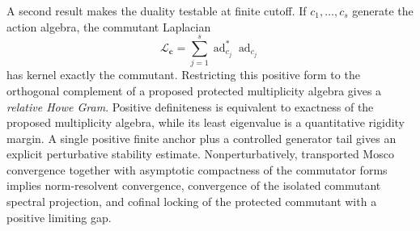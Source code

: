 \documentclass[11pt]{article}
\theoremstyle{definition}
\theoremstyle{remark}
\begin{document}
A second result makes the duality testable at finite cutoff.  If
$c_1,\ldots,c_s$ generate the action algebra, the commutant Laplacian
\[
\mathscr L_{\bm c}
=
\sum_{j=1}^{s}\operatorname{ad}_{c_j}^*
                 \operatorname{ad}_{c_j}
\]
has kernel exactly the commutant.  Restricting this positive form to the
orthogonal complement of a proposed protected multiplicity algebra gives a
\emph{relative Howe Gram}.  Positive definiteness is equivalent to exactness
of the proposed multiplicity algebra, while its least eigenvalue is a
quantitative rigidity margin.  A single positive finite anchor plus a
controlled generator tail gives an explicit perturbative stability estimate.
Nonperturbatively, transported Mosco convergence together with asymptotic
compactness of the commutator forms implies norm-resolvent convergence,
convergence of the isolated commutant spectral projection, and cofinal locking
of the protected commutant with a positive limiting gap.
\end{document}
